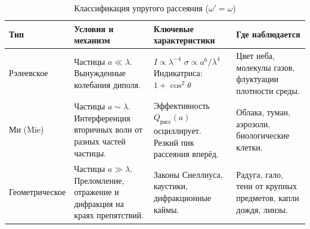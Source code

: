 \documentclass[12pt, a4paper]{article}
\begin{document}




\begin{table}[H]
\centering
\small
\renewcommand{\arraystretch}{1.3}
\label{tab:elastic}
\begin{tabular}{|l|p{3.5cm}|p{3.5cm}|p{3.5cm}|}
\hline
\textbf{Тип} & \textbf{Условия и механизм} & \textbf{Ключевые характеристики} & \textbf{Где наблюдается} \\
\hline
Рэлеевское & Частицы $a \ll \lambda$. \newline Вынужденные колебания диполя. & $I \propto \lambda^{-4}$ \newline $\sigma \propto a^6/\lambda^4$ \newline Индикатриса:\newline $1+\cos^2\theta$ & Цвет неба, \newline молекулы газов, флуктуации плотности среды. \\
\hline
Ми (Mie) & Частицы $a \sim \lambda$. \newline Интерференция вторичных волн от разных частей частицы. & Эффективность $Q_{\text{расс}}(a)$ осциллирует. \newline Резкий пик рассеяния вперёд. & Облака, туман, аэрозоли, биологические клетки. \\
\hline
Геометрическое & Частицы $a \gg \lambda$. \newline Преломление, отражение и дифракция на краях препятствий. & Законы Снеллиуса, \newline каустики, \newline дифракционные каймы. & Радуга, гало, тени от крупных предметов, капли дождя, линзы. \\
\hline
\end{tabular}
\caption{Классификация упругого рассеяния ($\omega' = \omega$)}
\end{table}
\end{document}
